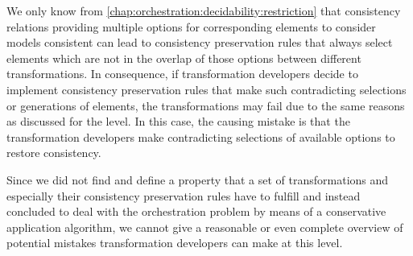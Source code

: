 We only know from \autoref{chap:orchestration:decidability:restriction} that consistency relations providing multiple options for corresponding elements to consider models consistent can lead to consistency preservation rules that always select elements which are not in the overlap of those options between different transformations.
In consequence, if transformation developers decide to implement consistency preservation rules that make such contradicting selections or generations of elements, the transformations may fail due to the same reasons as discussed for the \levelnetworkrelation level.
In this case, the causing mistake is that the transformation developers make contradicting selections of available options to restore consistency.

Since we did not find and define a property that a set of transformations and especially their consistency preservation rules have to fulfill and instead concluded to deal with the orchestration problem by means of a conservative application algorithm, we cannot give a reasonable or even complete overview of potential mistakes transformation developers can make at this level.


